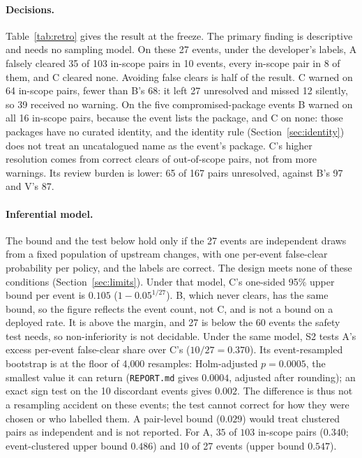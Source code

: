 \documentclass[11pt,a4paper]{article}
\newcommand{\code}[1]{\texttt{#1}}
\begin{document}
\paragraph{Decisions.} Table~\ref{tab:retro} gives the result at the
freeze. The primary finding is descriptive and needs no sampling
model. On these 27 events, under the developer's labels, A falsely
cleared 35 of 103 in-scope pairs in 10 events, every in-scope pair in
8 of them, and C cleared none. Avoiding false clears is half of the
result. C warned on 64 in-scope pairs, fewer than B's 68: it left 27
unresolved and missed 12 silently, so 39 received no warning. On the
five compromised-package events B warned on all 16 in-scope pairs,
because the event lists the package, and C on none: those packages
have no curated identity, and the identity rule
(Section~\ref{sec:identity}) does not treat an uncatalogued name as
the event's package. C's higher resolution comes from correct clears
of out-of-scope pairs, not from more warnings. Its review burden is
lower: 65 of 167 pairs unresolved, against B's 97 and V's 87.

\paragraph{Inferential model.} The bound and the test below hold only
if the 27 events are independent draws from a fixed population of
upstream changes, with one per-event false-clear probability per
policy, and the labels are correct. The design meets none of these
conditions (Section~\ref{sec:limits}). Under that model, C's one-sided
95\% upper bound per event is $0.105$ ($1-0.05^{1/27}$). B, which never
clears, has the same bound, so the figure reflects the event count,
not C, and is not a bound on a deployed rate. It is above the margin,
and 27 is below the 60 events the safety test needs, so
non-inferiority is not decidable. Under the same model, S2 tests A's
excess per-event false-clear share over C's ($10/27 = 0.370$). Its
event-resampled bootstrap is at the floor of 4{,}000 resamples:
Holm-adjusted $p = 0.0005$, the smallest value it can return
(\code{REPORT.md} gives $0.0004$, adjusted after rounding); an exact
sign test on the 10 discordant events gives $0.002$. The difference is
thus not a resampling accident on these events; the test cannot
correct for how they were chosen or who labelled them. A pair-level
bound ($0.029$) would treat clustered pairs as independent and is not
reported. For A, $35$ of $103$ in-scope pairs ($0.340$;
event-clustered upper bound $0.486$) and 10 of 27 events (upper bound
$0.547$).
\end{document}

